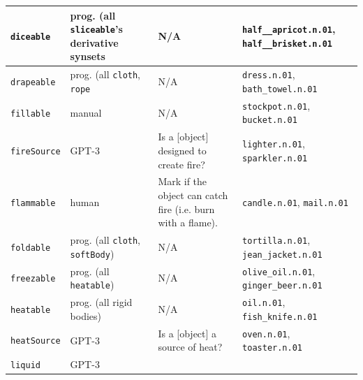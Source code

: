 {\begin{longtable}{|l|p{}|p{}|p{}|}
        \\\hline
        \texttt{diceable} & 
             prog. (all \texttt{sliceable}'s derivative synsets &
            N/A & 
              \texttt{half\_\_apricot.n.01},  \texttt{half\_\_brisket.n.01} 
        \\\hline
        \texttt{drapeable} & 
             prog. (all \texttt{cloth}, \texttt{rope} &
            N/A & 
              \texttt{dress.n.01},  \texttt{bath\_towel.n.01} 
        \\\hline
        \texttt{fillable} & 
             manual &
            N/A & 
              \texttt{stockpot.n.01},  \texttt{bucket.n.01} 
        \\\hline
        \texttt{fireSource} & 
            GPT-3 &
            Is a [object] designed to create fire? & 
             \texttt{lighter.n.01}, \texttt{sparkler.n.01} 
        \\\hline
        \texttt{flammable} & 
            human &
            Mark if the object can catch fire (i.e. burn with a flame). &
             \texttt{candle.n.01}, \texttt{mail.n.01}
        \\\hline
        \texttt{foldable} & 
             prog. (all \texttt{cloth}, \texttt{softBody}) &
            N/A & 
             \texttt{tortilla.n.01}, \texttt{jean\_jacket.n.01} 
        \\\hline
        \texttt{freezable} & 
             prog. (all \texttt{heatable}) &
            N/A & 
             \texttt{olive\_oil.n.01}, \mbox{\texttt{ginger\_beer.n.01}}
        \\\hline
        \texttt{heatable} & 
            prog. (all rigid bodies) &
            N/A & 
             \texttt{oil.n.01}, \texttt{fish\_knife.n.01} 
        \\\hline
        \texttt{heatSource} & 
            GPT-3 &
            Is a [object] a source of heat? & 
             \texttt{oven.n.01}, \texttt{toaster.n.01} 
        \\\hline
        \texttt{liquid} & 
            GPT-3 &

\end{longtable}}
